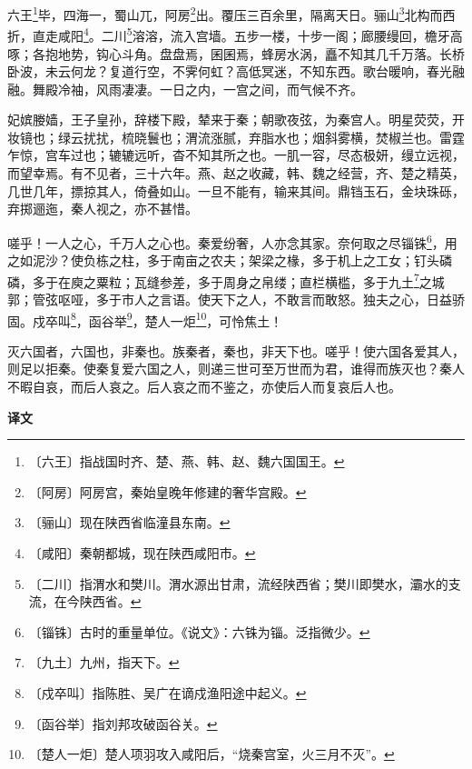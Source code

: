 \documentclass[12pt,UTF-8,openany,a4]{ctexbook}
\begin{document}
\begin{large}
    
    六王\footnote{〔六王〕\yiwen 指战国时齐、楚、燕、韩、赵、魏六国国王。}毕，四海一，蜀山兀，阿房\footnote{〔阿房〕\yiwen 阿房宫，秦始皇晚年修建的奢华宫殿。}出。覆压三百余里，隔离天日。骊山\footnote{〔骊山〕\yiwen 现在陕西省临潼县东南。}北构而西折，直走咸阳\footnote{〔咸阳〕\yiwen 秦朝都城，现在陕西咸阳市。}。二川\footnote{〔二川〕\yiwen 指渭水和樊川。渭水源出甘肃，流经陕西省；樊川即樊水，灞水的支流，在今陕西省。}溶溶，流入宫墙。五步一楼，十步一阁；廊腰缦回，檐牙高啄；各抱地势，钩心斗角。盘盘焉，囷囷焉，蜂房水涡，矗不知其几千万落。长桥卧波，未云何龙？复道行空，不霁何虹？高低冥迷，不知东西。歌台暖响，春光融融。舞殿冷袖，风雨凄凄。一日之内，一宫之间，而气候不齐。
    
    妃嫔媵嫱，王子皇孙，辞楼下殿，辇来于秦；朝歌夜弦，为秦宫人。明星荧荧，开妆镜也；绿云扰扰，梳晓鬟也；渭流涨腻，弃脂水也；烟斜雾横，焚椒兰也。雷霆乍惊，宫车过也；辘辘远听，杳不知其所之也。一肌一容，尽态极妍，缦立远视，而望幸焉。有不见者，三十六年。燕、赵之收藏，韩、魏之经营，齐、楚之精英，几世几年，摽掠其人，倚叠如山。一旦不能有，输来其间。鼎铛玉石，金块珠砾，弃掷逦迤，秦人视之，亦不甚惜。
    
    嗟乎！一人之心，千万人之心也。秦爱纷奢，人亦念其家。奈何取之尽锱铢\footnote{〔锱铢〕\yiwen 古时的重量单位。《说文》：六铢为锱。泛指微少。}，用之如泥沙？使负栋之柱，多于南亩之农夫；架梁之椽，多于机上之工女；钉头磷磷，多于在庾之粟粒；瓦缝参差，多于周身之帛缕；直栏横槛，多于九土\footnote{〔九土〕\yiwen 九州，指天下。}之城郭；管弦呕哑，多于市人之言语。使天下之人，不敢言而敢怒。独夫之心，日益骄固。戍卒叫\footnote{〔戍卒叫〕\yiwen 指陈胜、吴广在谪戍渔阳途中起义。}，函谷举\footnote{〔函谷举〕\yiwen 指刘邦攻破函谷关。}，楚人一炬\footnote{〔楚人一炬〕\yiwen 楚人项羽攻入咸阳后，“烧秦宫室，火三月不灭”。}，可怜焦土！
    
    灭六国者，六国也，非秦也。族秦者，秦也，非天下也。嗟乎！使六国各爱其人，则足以拒秦。使秦复爱六国之人，则递三世可至万世而为君，谁得而族灭也？秦人不暇自哀，而后人哀之。后人哀之而不鉴之，亦使后人而复哀后人也。
\end{large}


\newpage

\begin{Large}
    \noindent\textbf{译文}
\end{Large}


\vspace{1em}
\end{document}
